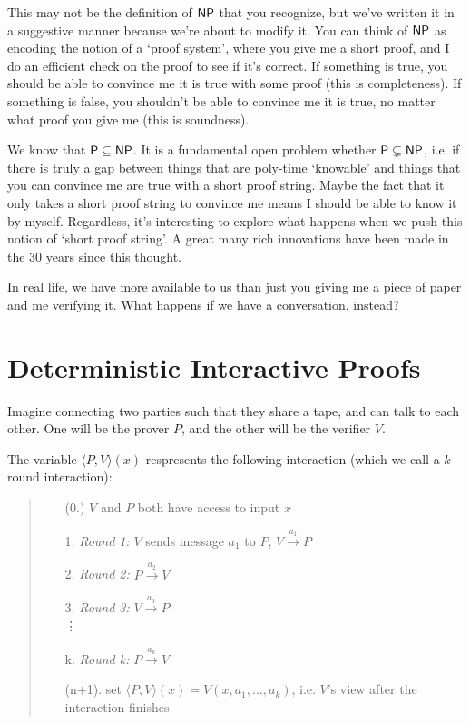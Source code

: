 \documentclass{article}
\begin{document}
This may not be the definition of $\mathsf{NP}$ that you recognize, but we've written it in a suggestive manner because we're about to modify it.
You can think of $\mathsf{NP}$ as encoding the notion of a `proof system', where you give me a short proof,
and I do an efficient check on the proof to see if it's correct.
If something is true, you should be able to convince me it is true with some proof (this is completeness).
If something is false, you shouldn't be able to convince me it is true, no matter what proof you give me (this is soundness). 

We know that $\mathsf{P} \subseteq \mathsf{NP}$. 
It is a fundamental open problem whether $\mathsf{P} \subsetneq \mathsf{NP}$, i.e. if there is truly a gap between things that are
poly-time `knowable' and things that you can convince me are true with a short proof string.
Maybe the fact that it only takes a short proof string to convince me means I should be able to know it by myself.
Regardless, it's interesting to explore what happens when we push this notion of `short proof string'.
A great many rich innovations have been made in the 30 years since this thought.

In real life, we have more available to us than just you giving me a piece of paper and me verifying it.
What happens if we have a conversation, instead?

\section{Deterministic Interactive Proofs}

Imagine connecting two parties such that they share a tape, and can talk to each other.
One will be the prover $P$, and the other will be the verifier $V$.

\begin{definition}
The variable $\langle P, V \rangle(x)$ respresents the following interaction (which we call a \textnormal{$k$-round interaction}):
\begin{quote}
\begin{enumerate}
    \item[(0.)] $V$ and $P$ both have access to input $x$
    \item[1.] \textit{Round 1:} $V$ sends message $a_1$ to $P$, $V \stackrel{a_1}{\longrightarrow} P$
    \item[2.] \textit{Round 2:} $P \stackrel{a_2}{\longrightarrow} V$ 
    \item[3.] \textit{Round 3:} $V \stackrel{a_3}{\longrightarrow} P$\\
    \vdots 
    \item[k.] \textit{Round k:} $P \stackrel{a_k}{\longrightarrow} V$
    \item[(n+1).] set $ \langle P, V \rangle(x) = V(x, a_1, \ldots, a_k)$, i.e. $V$'s view after the interaction finishes
\end{enumerate}
\end{quote}
\end{definition}
\end{document}
